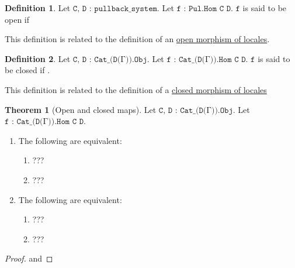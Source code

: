 \documentclass{book}
\theoremstyle{definition}
\newtheorem{definition}{Definition}
\newtheorem{theorem}{Theorem}
\begin{document}
\begin{definition}
Let $\texttt{C, D : pullback\_system}$. Let $\texttt{f : Pul.Hom C D}$. $\texttt{f}$ is said to be open if 
\end{definition}



This definition is related to the definition of an \href{https://ncatlab.org/nlab/show/open+morphism}{open morphism of locales}.

\begin{definition}
Let $\texttt{C, D : Cat\_(D(Γ)).Obj}$. Let $\texttt{f : Cat\_(D(Γ)).Hom C D}$. $\texttt{f}$ is said to be closed if .
\end{definition}

This definition is related to the definition of a \href{https://ncatlab.org/nlab/show/closed+morphism}{closed morphism of locales}

\begin{theorem}[Open and closed maps]
Let $\texttt{C, D : Cat\_(D(Γ)).Obj}$. Let $\texttt{f : Cat\_(D(Γ)).Hom C D}$.
\begin{enumerate}
\item The following are equivalent: 
\begin{enumerate}
\item ??? 
\item ???
\end{enumerate}
\item The following are equivalent:
\begin{enumerate}
\item ??? 
\item ???
\end{enumerate}
\end{enumerate}
\end{theorem}

\begin{proof}

and

\end{proof}
\end{document}
